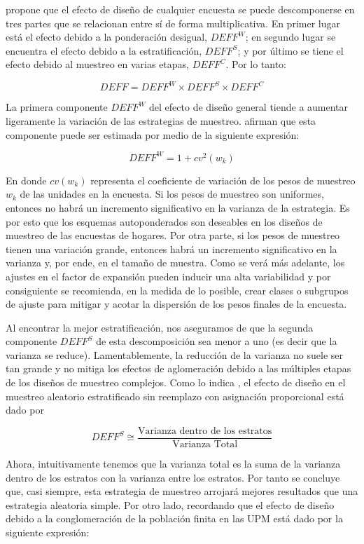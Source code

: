 \documentclass[
  12pt,
  spanish,
]{book}
\begin{document}
\citet{Park_2003} propone que el efecto de diseño de cualquier encuesta se puede descomponerse en tres partes que se relacionan entre sí de forma multiplicativa. En primer lugar está el efecto debido a la ponderación desigual, \(DEFF^W\); en segundo lugar se encuentra el efecto debido a la estratificación, \(DEFF^S\); y por último se tiene el efecto debido al muestreo en varias etapas, \(DEFF^C\). Por lo tanto:

\[
DEFF = DEFF^W \times DEFF^S \times DEFF^C
\]

La primera componente \(DEFF^W\) del efecto de diseño general tiende a aumentar ligeramente la variación de las estrategias de muestreo. \citet{Valliant_Dever_Kreuter_2018} afirman que esta componente puede ser estimada por medio de la siguiente expresión:

\[
DEFF^W = 1 + cv^2(w_k)
\]

En donde \(cv(w_k)\) representa el coeficiente de variación de los pesos de muestreo \(w_k\) de las unidades en la encuesta. Si los pesos de muestreo son uniformes, entonces no habrá un incremento significativo en la varianza de la estrategia. Es por esto que los esquemas autoponderados son deseables en los diseños de muestreo de las encuestas de hogares. Por otra parte, si los pesos de muestreo tienen una variación grande, entonces habrá un incremento significativo en la varianza y, por ende, en el tamaño de muestra. Como se verá más adelante, los ajustes en el factor de expansión pueden inducir una alta variabilidad y por consiguiente se recomienda, en la medida de lo posible, crear clases o subgrupos de ajuste para mitigar y acotar la dispersión de los pesos finales de la encuesta.

Al encontrar la mejor estratificación, nos aseguramos de que la segunda componente \(DEFF^S\) de esta descomposición sea menor a uno (es decir que la varianza se reduce). Lamentablemente, la reducción de la varianza no suele ser tan grande y no mitiga los efectos de aglomeración debido a las múltiples etapas de los diseños de muestreo complejos. Como lo indica \citet{Gutierrez_2016}, el efecto de diseño en el muestreo aleatorio estratificado sin reemplazo con asignación proporcional está dado por

\[
DEFF^S \cong\frac{\text{Varianza dentro de los estratos}}{\text{Varianza Total}}
\]

Ahora, intuitivamente tenemos que la varianza total es la suma de la varianza dentro de los estratos con la varianza entre los estratos. Por tanto se concluye que, casi siempre, esta estrategia de muestreo arrojará mejores resultados que una estrategia aleatoria simple. Por otro lado, recordando que el efecto de diseño debido a la conglomeración de la población finita en las UPM está dado por la siguiente expresión:
\end{document}
